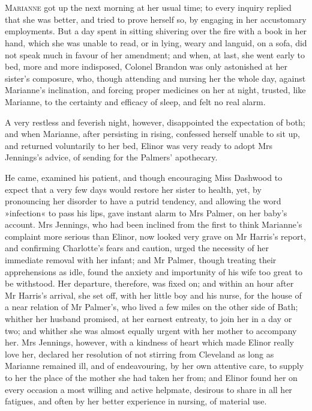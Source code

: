 \chapter[Chapter \thechapter]{}
\lettrine[lines=4,lraise=0.3]{M}{arianne} got up the next morning at her usual time; to every inquiry replied that she was better, and tried to prove herself so, by engaging in her accustomary employments. But a day spent in sitting shivering over the fire with a book in her hand, which she was unable to read, or in lying, weary and languid, on a sofa, did not speak much in favour of her amendment; and when, at last, she went early to bed, more and more indisposed, Colonel Brandon was only astonished at her sister’s composure, who, though attending and nursing her the whole day, against Marianne’s inclination, and forcing proper medicines on her at night, trusted, like Marianne, to the certainty and efficacy of sleep, and felt no real alarm.

A very restless and feverish night, however, disappointed the expectation of both; and when Marianne, after persisting in rising, confessed herself unable to sit up, and returned voluntarily to her bed, Elinor was very ready to adopt Mrs Jennings’s advice, of sending for the Palmers’ apothecary.

He came, examined his patient, and though encouraging Miss Dashwood to expect that a very few days would restore her sister to health, yet, by pronouncing her disorder to have a putrid tendency, and allowing the word »infection« to pass his lips, gave instant alarm to Mrs Palmer, on her baby’s account. Mrs Jennings, who had been inclined from the first to think Marianne’s complaint more serious than Elinor, now looked very grave on Mr Harris’s report, and confirming Charlotte’s fears and caution, urged the necessity of her immediate removal with her infant; and Mr Palmer, though treating their apprehensions as idle, found the anxiety and importunity of his wife too great to be withstood. Her departure, therefore, was fixed on; and within an hour after Mr Harris’s arrival, she set off, with her little boy and his nurse, for the house of a near relation of Mr Palmer’s, who lived a few miles on the other side of Bath; whither her husband promised, at her earnest entreaty, to join her in a day or two; and whither she was almost equally urgent with her mother to accompany her. Mrs Jennings, however, with a kindness of heart which made Elinor really love her, declared her resolution of not stirring from Cleveland as long as Marianne remained ill, and of endeavouring, by her own attentive care, to supply to her the place of the mother she had taken her from; and Elinor found her on every occasion a most willing and active helpmate, desirous to share in all her fatigues, and often by her better experience in nursing, of material use.

